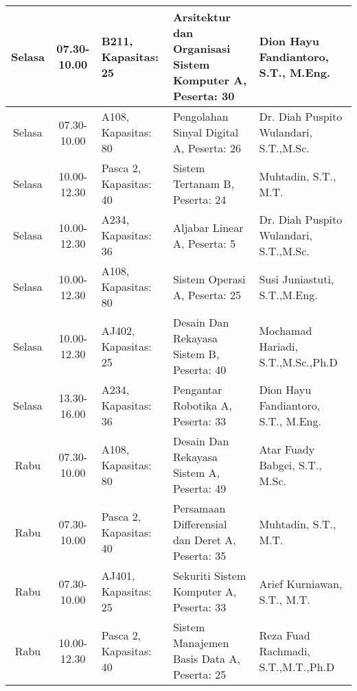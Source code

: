 \begin{longtable}[c]{|c|c|>{\centering\arraybackslash}m{2.5cm}|>{\centering\arraybackslash}m{4cm}|>{\centering\arraybackslash}m{3.2cm}|}
    Selasa & 07.30-10.00 & B211, Kapasitas: 25    & Arsitektur dan Organisasi Sistem Komputer A, \linebreak Peserta: 30 & Dion Hayu Fandiantoro, S.T., M.Eng.           \\ \hline
    Selasa & 07.30-10.00 & A108, Kapasitas: 80    & Pengolahan Sinyal Digital A, \linebreak Peserta: 26                 & Dr. Diah Puspito Wulandari, S.T.,M.Sc.        \\ \hline
    Selasa & 10.00-12.30 & Pasca 2, Kapasitas: 40 & Sistem Tertanam B, \linebreak Peserta: 24                           & Muhtadin, S.T., M.T.                          \\ \hline
    Selasa & 10.00-12.30 & A234, Kapasitas: 36    & Aljabar Linear A, \linebreak Peserta: 5                             & Dr. Diah Puspito Wulandari, S.T.,M.Sc.        \\ \hline
    Selasa & 10.00-12.30 & A108, Kapasitas: 80    & Sistem Operasi A, \linebreak Peserta: 25                            & Susi Juniastuti, S.T.,M.Eng.                  \\ \hline
    Selasa & 10.00-12.30 & AJ402, Kapasitas: 25   & Desain Dan Rekayasa Sistem B, \linebreak Peserta: 40                & Mochamad Hariadi, S.T.,M.Sc.,Ph.D             \\ \hline
    Selasa & 13.30-16.00 & A234, Kapasitas: 36    & Pengantar Robotika A, \linebreak Peserta: 33                        & Dion Hayu Fandiantoro, S.T., M.Eng.           \\ \hline
    Rabu   & 07.30-10.00 & A108, Kapasitas: 80    & Desain Dan Rekayasa Sistem A, \linebreak Peserta: 49                & Atar Fuady Babgei, S.T., M.Sc.                \\ \hline
    Rabu   & 07.30-10.00 & Pasca 2, Kapasitas: 40 & Persamaan Differensial dan Deret A, \linebreak Peserta: 35          & Muhtadin, S.T., M.T.                          \\ \hline
    Rabu   & 07.30-10.00 & AJ401, Kapasitas: 25   & Sekuriti Sistem Komputer A, \linebreak Peserta: 33                  & Arief Kurniawan, S.T., M.T.                   \\ \hline
    Rabu   & 10.00-12.30 & Pasca 2, Kapasitas: 40 & Sistem Manajemen Basis Data A, \linebreak Peserta: 25               & Reza Fuad Rachmadi, S.T.,M.T.,Ph.D            \\ \hline

\end{longtable}
